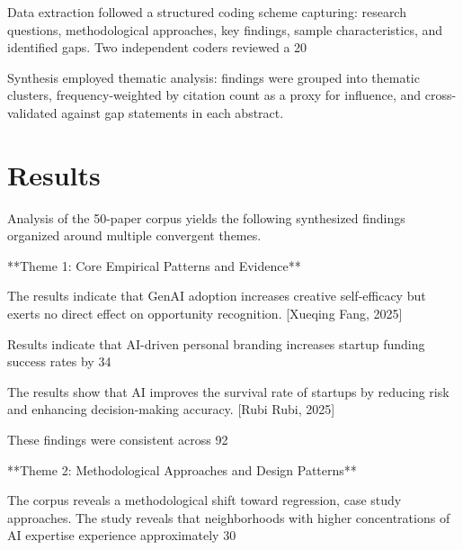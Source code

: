 \documentclass[11pt, a4paper]{article}
\begin{document}
Data extraction followed a structured coding scheme capturing: research questions, methodological approaches, key findings, sample characteristics, and identified gaps. Two independent coders reviewed a 20%

Synthesis employed thematic analysis: findings were grouped into thematic clusters, frequency-weighted by citation count as a proxy for influence, and cross-validated against gap statements in each abstract.

\section{Results}
Analysis of the 50-paper corpus yields the following synthesized findings organized around multiple convergent themes.

**Theme 1: Core Empirical Patterns and Evidence**

The results indicate that GenAI adoption increases creative self-efficacy but exerts no direct effect on opportunity recognition. [Xueqing Fang, 2025]

Results indicate that AI-driven personal branding increases startup funding success rates by 34%

The results show that AI improves the survival rate of startups by reducing risk and enhancing decision-making accuracy. [Rubi Rubi, 2025]

These findings were consistent across 92%

**Theme 2: Methodological Approaches and Design Patterns**

The corpus reveals a methodological shift toward regression, case study approaches. The study reveals that neighborhoods with higher concentrations of AI expertise experience approximately 30%
\end{document}
